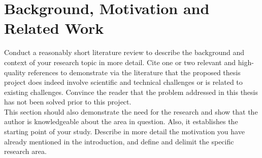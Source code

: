 \section*{Background, Motivation and Related Work}

Conduct a reasonably short literature review to describe the background and context of your research topic in more detail. Cite one or two relevant and high-quality references to demonstrate via the literature that the proposed thesis project does indeed involve scientific and technical challenges or is related to existing challenges. Convince the reader that the problem addressed in this thesis has not been solved prior to this project.\\

\noindent This section should also demonstrate the need for the research and show that the author is knowledgeable about the area in question. Also, it establishes the starting point of your study. Describe in more detail the motivation you have already mentioned in the introduction, and define and delimit the specific research area.
